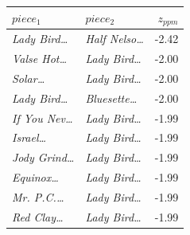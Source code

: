 \begin{tabular}{llr}
\toprule
$piece_1$ & $piece_2$ & $z_{ppm}$ \\
\midrule
\textit{Lady Bird\dots} & \textit{Half Nelso\dots} & -2.42 \\
\textit{Valse Hot\dots} & \textit{Lady Bird\dots} & -2.00 \\
\textit{Solar\dots} & \textit{Lady Bird\dots} & -2.00 \\
\textit{Lady Bird\dots} & \textit{Bluesette\dots} & -2.00 \\
\textit{If You Nev\dots} & \textit{Lady Bird\dots} & -1.99 \\
\textit{Israel\dots} & \textit{Lady Bird\dots} & -1.99 \\
\textit{Jody Grind\dots} & \textit{Lady Bird\dots} & -1.99 \\
\textit{Equinox\dots} & \textit{Lady Bird\dots} & -1.99 \\
\textit{Mr. P.C.\dots} & \textit{Lady Bird\dots} & -1.99 \\
\textit{Red Clay\dots} & \textit{Lady Bird\dots} & -1.99 \\
\bottomrule
\end{tabular}
